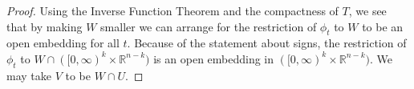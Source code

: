 \documentclass[11pt]{amsart}
\theoremstyle{definition}
\numberwithin{equation}{section}
\numberwithin{figure}{section}
\newcommand{\R}{\mathbb R}
\begin{document}
\begin{proof}
	Using the Inverse Function Theorem and the compactness of $T$, we see that by making $W$ smaller we can arrange for the restriction of $\phi_t$ to $W$ to be an open embedding for all $t$. Because of the statement about signs, the restriction of $\phi_t$ to $W\cap ([0,\infty)^k\times \R^{n-k})$ is an open embedding in $([0,\infty)^k\times \R^{n-k})$. We may take $V$ to be $W\cap U$.
%	
%	
%	

\end{proof}
\end{document}
